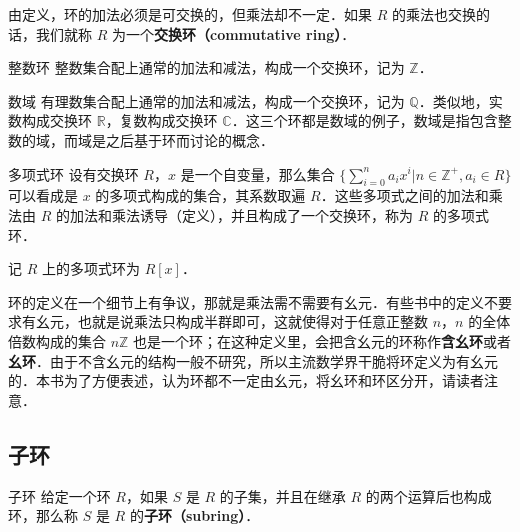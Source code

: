 由定义，环的加法必须是可交换的，但乘法却不一定．如果 $R$ 的乘法也交换的话，我们就称 $R$ 为一个\textbf{交换环（commutative ring）}．

\begin{example}{整数环}
整数集合配上通常的加法和减法，构成一个交换环，记为 $\mathbb{Z}$．
\end{example}

\begin{example}{数域}
有理数集合配上通常的加法和减法，构成一个交换环，记为 $\mathbb{Q}$．类似地，实数构成交换环 $\mathbb{R}$，复数构成交换环 $\mathbb{C}$．这三个环都是数域的例子，数域是指包含整数的域，而域是之后基于环而讨论的概念．
\end{example}

\begin{example}{多项式环}
设有交换环 $R$，$x$ 是一个自变量，那么集合 $\{\sum\limits_{i=0}^n a_ix^i|n\in\mathbb{Z}^+, a_i\in R\}$ 可以看成是 $x$ 的多项式构成的集合，其系数取遍 $R$．这些多项式之间的加法和乘法由 $R$ 的加法和乘法诱导（定义），并且构成了一个交换环，称为 $R$ 的多项式环．

记 $R$ 上的多项式环为 $R[x]$．
\end{example}

环的定义在一个细节上有争议，那就是乘法需不需要有幺元．有些书中的定义不要求有幺元，也就是说乘法只构成半群即可，这就使得对于任意正整数 $n$，$n$ 的全体倍数构成的集合 $n\mathbb{Z}$ 也是一个环；在这种定义里，会把含幺元的环称作\textbf{含幺环}或者\textbf{幺环}．由于不含幺元的结构一般不研究，所以主流数学界干脆将环定义为有幺元的．本书为了方便表述，认为环都不一定由幺元，将幺环和环区分开，请读者注意．

\subsection{子环}

\begin{definition}{子环}
给定一个环 $R$，如果 $S$ 是 $R$ 的子集，并且在继承 $R$ 的两个运算后也构成环，那么称 $S$ 是 $R$ 的\textbf{子环（subring）}．
\end{definition}



